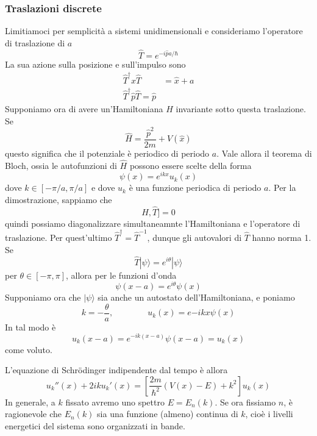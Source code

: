 \documentclass[a4paper, 11pt]{article}
\newcommand{\op}[1]{\hat{#1}}
\renewcommand{\op}[1]{\hat{#1}}
\newcommand{\ham}{\hat{H}}
\renewcommand{\ket}[1]{| #1\rangle}
\begin{document}
\subsubsection{Traslazioni discrete}
Limitiamoci per semplicità a sistemi unidimensionali e consideriamo l'operatore di traslazione di $a$
\[\op T=e^{-i\op{p}a/\hbar}\]
La sua azione sulla posizione e sull'impulso sono
\begin{align*}\op T^\dagger\op x\op T&=\op x+a\\\op T^\dagger\op p\op T=\op p\end{align*}
Supponiamo ora di avere un'Hamiltoniana $\ham$ invariante sotto questa traslazione. Se
\[\ham=\frac{\op p^2}{2m}+V(\op x)\]
questo significa che il potenziale è periodico di periodo $a$. Vale allora il teorema di Bloch, ossia le autofunzioni di $\ham$ possono essere scelte della forma
\[\psi(x)=e^{ikx}u_k(x)\]
dove $k\in[-\pi/a,\pi/a]$ e dove $u_k$ è una funzione periodica di periodo $a$. Per la dimostrazione, sappiamo che
\[\ham,\op T]=0\]
quindi possiamo diagonalizzare simultaneamnte l'Hamiltoniana e l'operatore di traslazione. Per quest'ultimo $\op T^\dagger=\op T^{-1}$, dunque gli autovalori di $\op{T}$ hanno norma 1. Se
\[\op T\ket{\psi}=e^{i\theta}\ket{\psi}\]
per $\theta\in[-\pi,\pi]$, allora per le funzioni d'onda
\[\psi(x-a)=e^{i\theta}\psi(x)\]
Supponiamo ora che $\ket{\psi}$ sia anche un autostato dell'Hamiltoniana, e poniamo
\[k=-\frac{\theta}{a},\qquad\qquad u_k(x)=e{-ikx}\psi(x)\]
In tal modo è
\[u_k(x-a)=e^{-ik(x-a)}\psi(x-a)=u_k(x)\]
come voluto.

L'equazione di Schr\"odinger indipendente dal tempo è allora
\[u_k''(x)+2iku_k'(x)=\left[\frac{2m}{\hbar^2}\left(V(x)-E\right)+k^2\right]u_k(x)\]
In generale, a $k$ fissato avremo uno spettro $E=E_n(k)$. Se ora fissiamo $n$, è ragionevole che $E_n(k)$ sia una funzione (almeno) continua di $k$, cioè i livelli energetici del sistema sono organizzati in bande.
\end{document}

